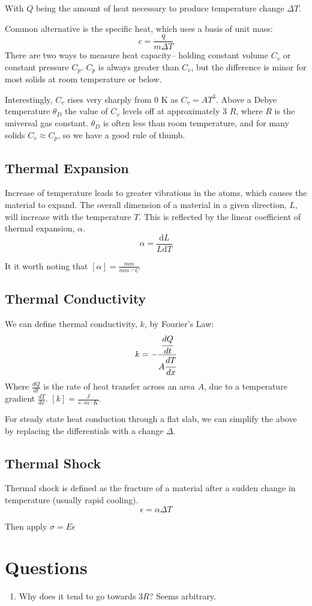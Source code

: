 \documentclass[10pt,letterpaper]{article}
\begin{document}
	With $Q$ being the amount of heat necessary to produce temperature change $\Delta T$.
	
	Common alternative is the specific heat, which uses a basis of unit mass: 
	$$
	c= \frac{q}{m \Delta T}
	$$ 
	There are two ways to measure heat capacity-- holding constant volume $C_v$ or constant pressure $C_p$. $C_p$ is always greater than $C_v$, but the difference is minor for most solids at room temperature or below.  
	
	Interestingly, $C_v$ rises very sharply from 0 K as $C_v = AT^3$.  Above a Debye temperature $\theta_D$ the value of $C_v$ levels off at approximately 3 $R$, where $R$ is the universal gas constant. $\theta_D$ is often less than room temperature, and for many solids $C_v \approx C_p$, so we have a good rule of thumb. 
	\subsection{Thermal Expansion}
	
	Increase of temperature leads to greater vibrations in the atoms, which causes the material to expand. The overall dimension of a material in a given direction, $L$, will increase with the temperature $T$.  This is reflected by the linear coefficient of thermal expansion, $\alpha$. 
	$$
	\alpha = \frac{\text{d}L}{L \text{d} T}
	$$
	
	It it worth noting that $[\alpha] = \frac{mm}{mm \cdot ^{\circ} C}$
	\subsection{Thermal Conductivity}
	We can define thermal conductivity, $k$, by Fourier's Law: 
	$$
	k = - \cfrac{\cfrac{dQ}{dt}}{A\cfrac{dT}{dx}}
	$$
	Where $\frac{dQ}{dt}$ is the rate of heat transfer across an area $A$, due to a temperature gradient $\frac{dT}{dx}$. $[k] = \frac{J}{s \cdot m \cdot K}$. 
	
	For steady state heat conduction through a flat slab, we can simplify the above by replacing the differentials with a change $\Delta$.  
	
	\subsection{Thermal Shock}
	Thermal shock is defined as the fracture of a material after a sudden change in temperature (usually rapid cooling). 
	$$
	\epsilon = \alpha \Delta T
	$$
	
Then apply $\sigma = E\epsilon$

\section*{Questions}
\begin{enumerate}
	\item Why does it tend to go towards $3R$?  Seems arbitrary. 
\end{enumerate}
	
\end{document}
